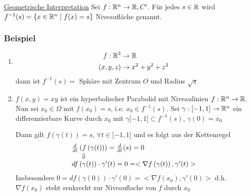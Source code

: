\noindent \underline{Geometrische Interpretation}
Sei $f:\mathbb{R}^n\to\mathbb{R}, C'$. Für jedes $s\in\mathbb{R}$ wird $f^{-1}(s)=\left\{ x\in\mathbb{R}^n\mid f(x)=s\right\}$ Niveaufläche genannt.

\subsubsection*{Beispiel}
\begin{enumerate}
    \item \begin{align*}
 f:\mathbb{R}^3 &\to\mathbb{R}\\
 \left( x,y,z\right) &\to x^2 +y^2 +z^2
 \end{align*}
dann ist $f^{-1}(s)=$ Sphäre mit Zentrum $O$ und Radius $\sqrt{s}$
\item $f\left( x,y\right) = xy$ ist ein hyperbolischer Parabolid mit Niveaulinien  $f:\mathbb{R}^n \to\mathbb{R}$. Nun sei $x_0\in\Omega$ mit $f\left( x_0\right) = s$, i.e. $x_0 \in f^{-1} (s)$. Sei $\gamma :\lbrack -1,1\rbrack\to \mathbb{R}^n$ ein differenzierbare Kurve durch $x_0$ mit $\gamma\lbrack -1,1\rbrack\subset f^{-1}(s)$, $\gamma (0)=x_0$

\begin{center}
\end{center}

Dann gilt $f\left( \gamma (t)\right)=s$, $\forall t\in\lbrack -1,1\rbrack$ und es folgt aus der Kettenregel
\[\begin{array}{l}%
\frac{d}{{dt}}\left( {f\left( {\gamma (t)} \right)} \right) = \frac{d}{{dt}}(s) = 0\\
\hspace{5mm} \Downarrow \\
df\left( {\gamma (t)} \right) \cdot \gamma '(t) = 0 =  < \nabla f\left( {\gamma (t)} \right),\gamma '(t) >
\end{array}\]
Insbesondere $0=df\left(\gamma (0)\right)\cdot\gamma'(0)= < \nabla f\left( x_0\right),\gamma'(0) >$ d.h. $\nabla f\left( x_0\right)$ steht senkrecht zur Niveauflache von $f$ durch $x_0$

\end{enumerate}
